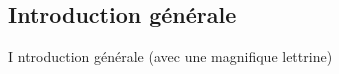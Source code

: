 {}
\adjustmtc

\thispagestyle{plain}

\vspace*{-1cm}
\begin{flushright}
\section*{\fontsize{20pt}{20pt}\selectfont\textnormal{Introduction générale}}
\end{flushright}
\vspace{2cm}

\chead[\fancyplain{}{}]
      {\fancyplain{}{}}
\lfoot[\fancyplain{}{\thepage}]%
      {\fancyplain{}{}}
\cfoot[\fancyplain{}{}]
      {\fancyplain{}{}}
\rfoot[\fancyplain{}{}]%
     {\fancyplain{}{\thepage}}
     


\lettrine[lines=1]{I}{ }ntroduction générale (avec une magnifique lettrine)




